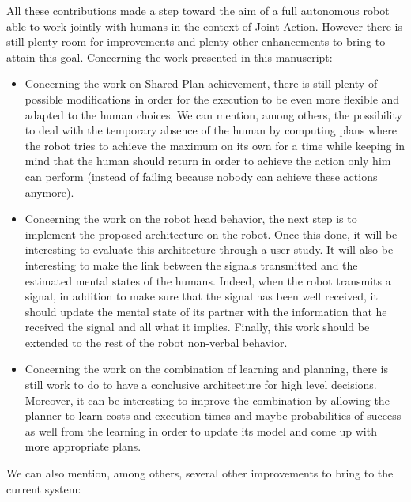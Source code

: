 \documentclass[english, a4paper,11pt,twoside]{StyleThese}
\begin{document}
All these contributions made a step toward the aim of a full autonomous robot able to work jointly with humans in the context of Joint Action. However there is still plenty room for improvements and plenty other enhancements to bring to attain this goal. Concerning the work presented in this manuscript:
\begin{itemize}
\item Concerning the work on Shared Plan achievement, there is still plenty of possible modifications in order for the execution to be even more flexible and adapted to the human choices. We can mention, among others, the possibility to deal with the temporary absence of the human by computing plans where the robot tries to achieve the maximum on its own for a time while keeping in mind that the human should return in order to achieve the action only him can perform (instead of failing because nobody can achieve these actions anymore).
\item Concerning the work on the robot head behavior, the next step is to implement the proposed architecture on the robot. Once this done, it will be interesting to evaluate this architecture through a user study. It will also be interesting to make the link between the signals transmitted and the estimated mental states of the humans. Indeed, when the robot transmits a signal, in addition to make sure that the signal has been well received, it should update the mental state of its partner with the information that he received the signal and all what it implies. Finally, this work should be extended to the rest of the robot non-verbal behavior.
\item Concerning the work on the combination of learning and planning, there is still work to do to have a conclusive architecture for high level decisions. Moreover, it can be interesting to improve the combination by allowing the planner to learn costs and execution times and maybe probabilities of success as well from the learning in order to update its model and come up with more appropriate plans.
\end{itemize}
We can also mention, among others, several other improvements to bring to the current system:
\end{document}

